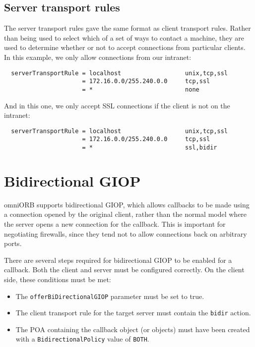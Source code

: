 \documentclass[11pt,twoside,a4paper]{book}
\newcommand{\code}[1]{\texttt{#1}}
\begin{document}
\subsection{Server transport rules}
\label{sec:serverRule}

The server transport rules gave the same format as client transport
rules. Rather than being used to select which of a set of ways to
contact a machine, they are used to determine whether or not to accept
connections from particular clients. In this example, we only allow
connections from our intranet:

\begin{verbatim}
  serverTransportRule = localhost                  unix,tcp,ssl
                      = 172.16.0.0/255.240.0.0     tcp,ssl
                      = *                          none
\end{verbatim}

\noindent And in this one, we only accept SSL connections if the
client is not on the intranet:

\begin{verbatim}
  serverTransportRule = localhost                  unix,tcp,ssl
                      = 172.16.0.0/255.240.0.0     tcp,ssl
                      = *                          ssl,bidir
\end{verbatim}




\section{Bidirectional GIOP}
\label{sec:bidir}

omniORB supports bidirectional GIOP, which allows callbacks to be made
using a connection opened by the original client, rather than the
normal model where the server opens a new connection for the callback.
This is important for negotiating firewalls, since they tend not to
allow connections back on arbitrary ports.

There are several steps required for bidirectional GIOP to be enabled
for a callback. Both the client and server must be configured
correctly. On the client side, these conditions must be met:

\begin{itemize}

\item The \code{offerBiDirectionalGIOP} parameter must be set to true. 
\item The client transport rule for the target server must contain the
      \code{bidir} action.
\item The POA containing the callback object (or objects) must have
      been created with a \code{BidirectionalPolicy} value of
      \code{BOTH}.

\end{itemize}
\end{document}
